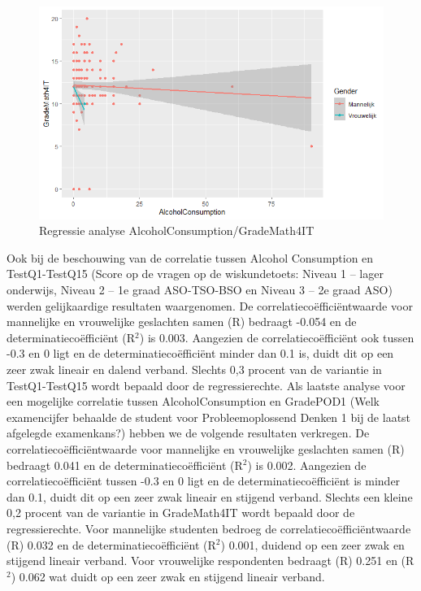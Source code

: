 \documentclass{hogent-article}
\begin{document}
\begin{figure}[ht]
    \begin{center}
        \includegraphics[width=\columnwidth]{AlcMath4IT.png}
    \end{center}
    \caption{Regressie analyse AlcoholConsumption/GradeMath4IT}
    \label{Regressie analyse AlcoholConsumption/GradeMath4IT}
\end{figure}

Ook bij de beschouwing van de correlatie tussen Alcohol Consumption en TestQ1-TestQ15 (Score op de vragen op de wiskundetoets: Niveau 1 – lager onderwijs, Niveau 2 – 1e graad ASO-TSO-BSO en Niveau 3 – 2e graad ASO) werden gelijkaardige resultaten waargenomen.
De correlatiecoëfficiëntwaarde voor mannelijke en vrouwelijke geslachten samen (R) bedraagt -0.054 en de determinatiecoëfficiënt (R$^{2}$) is 0.003. Aangezien de correlatiecoëfficiënt ook tussen -0.3 en 0 ligt en de determinatiecoëfficiënt minder dan 0.1 is, duidt dit op een zeer zwak lineair en dalend verband. Slechts 0,3 procent van de variantie in TestQ1-TestQ15 wordt bepaald door de regressierechte.
Als laatste analyse voor een mogelijke correlatie tussen AlcoholConsumption en GradePOD1 (Welk examencijfer behaalde de student voor Probleemoplossend Denken 1 bij de laatst afgelegde examenkans?) hebben we de volgende resultaten verkregen.
De correlatiecoëfficiëntwaarde voor mannelijke en vrouwelijke geslachten samen (R) bedraagt 0.041 en de determinatiecoëfficiënt (R$^{2}$) is 0.002. Aangezien de correlatiecoëfficiënt tussen -0.3 en 0 ligt en de determinatiecoëfficiënt is minder dan 0.1, duidt dit op een zeer zwak lineair en stijgend verband. Slechts een kleine 0,2 procent van de variantie in GradeMath4IT wordt bepaald door de regressierechte.
Voor mannelijke studenten bedroeg de correlatiecoëfficiëntwaarde (R)  0.032 en de determinatiecoëfficiënt (R$^{2}$) 0.001, duidend op een zeer zwak en stijgend lineair verband. Voor vrouwelijke respondenten bedraagt (R) 0.251 en (R$^{2}$) 0.062 wat duidt op een zeer zwak en stijgend lineair verband.
\end{document}
